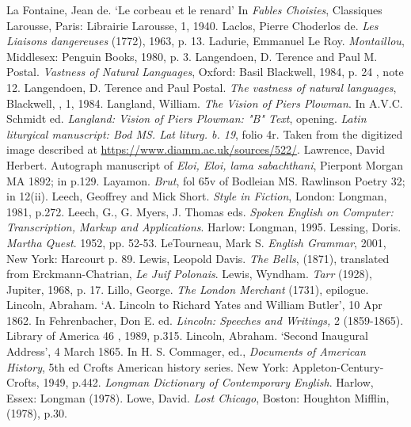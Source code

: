 \begin{bibitemlist}{1}
 La Fontaine, Jean de. ‘Le corbeau et le renard’ In \textit{Fables Choisies}, Classiques Larousse, Paris: Librairie Larousse, 1, 1940.
 Laclos, Pierre Choderlos de. \textit{Les Liaisons dangereuses} (1772), 1963, p. 13.
 Ladurie, Emmanuel Le Roy. \textit{Montaillou}, Middlesex: Penguin Books, 1980, p. 3.
 Langendoen, D. Terence and Paul M. Postal. \textit{Vastness of Natural Languages}, Oxford: Basil Blackwell, 1984, p. 24 , note 12.
 Langendoen, D. Terence and Paul Postal. \textit{The vastness of natural languages}, Blackwell, , 1, 1984.
 Langland, William. \textit{The Vision of Piers Plowman}. In A.V.C. Schmidt ed. \textit{Langland: Vision of Piers Plowman: "B" Text}, opening.
 \textit{Latin liturgical manuscript: Bod MS. Lat liturg. b. 19}, folio 4r. Taken from the digitized image described at \url{https://www.diamm.ac.uk/sources/522/}.
 Lawrence, David Herbert. Autograph manuscript of \textit{Eloi, Eloi, lama sabachthani}, Pierpont Morgan MA 1892; in \cite{KLINKENBORG} p.129.
 Layamon. \textit{Brut}, fol 65v of Bodleian MS. Rawlinson Poetry 32; in \cite{PARKES} 12(ii).
 Leech, Geoffrey and Mick Short. \textit{Style in Fiction}, London: Longman, 1981, p.272.
 Leech, G., G. Myers, J. Thomas eds. \textit{Spoken English on Computer: Transcription, Markup and Applications}. Harlow: Longman, 1995.
 Lessing, Doris. \textit{Martha Quest}. 1952, pp. 52-53.
 LeTourneau, Mark S.  \textit{English Grammar}, 2001, New York: Harcourt p. 89.
 Lewis, Leopold Davis. \textit{The Bells}, (1871), translated from Erckmann-Chatrian, \textit{Le Juif Polonais}.
 Lewis, Wyndham. \textit{Tarr} (1928), Jupiter, 1968, p. 17.
 Lillo, George. \textit{The London Merchant} (1731), epilogue.
 Lincoln, Abraham. ‘A. Lincoln to Richard Yates and William Butler’, 10 Apr 1862. In Fehrenbacher, Don E. ed. \textit{Lincoln: Speeches and Writings,} 2  (1859-1865). Library of America 46 , 1989, p.315.
 Lincoln, Abraham. ‘Second Inaugural Address’, 4 March 1865. In H. S. Commager, ed., \textit{Documents of American History}, 5th ed Crofts American history series. New York: Appleton-Century-Crofts, 1949, p.442.
 \textit{Longman Dictionary of Contemporary English}. Harlow, Essex: Longman (1978).
 Lowe, David. \textit{Lost Chicago}, Boston: Houghton Mifflin, (1978), p.30. 

\end{bibitemlist}
